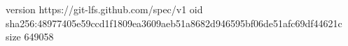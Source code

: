 version https://git-lfs.github.com/spec/v1
oid sha256:48977405e59ccd1f1809ea3609aeb51a8682d946595bf06de51afc69df44621c
size 649058
